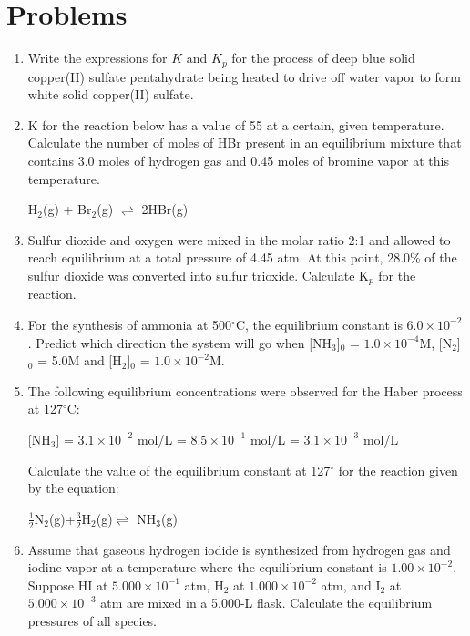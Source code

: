 \documentclass[../chem.tex]{subfiles}
\begin{document}
\section*{Problems}
\begin{enumerate}
    \item Write the expressions for $K$ and $K_p$ for the process of deep blue solid copper(II) sulfate pentahydrate being heated to drive off water vapor to form white solid copper(II) sulfate.
    \item K for the reaction below has a value of 55 at a certain, given temperature. Calculate the number of moles of HBr present in an equilibrium mixture that contains 3.0 moles of hydrogen gas and 0.45 moles of bromine vapor at this temperature.
    \begin{center}
        H$_2$(g) + Br$_2$(g) $\rightleftharpoons$ 2HBr(g)
    \end{center}
    \item Sulfur dioxide and oxygen were mixed in the molar ratio 2:1 and allowed to reach equilibrium at a total pressure of 4.45 atm. At this point, 28.0\% of the sulfur dioxide was converted into sulfur trioxide. Calculate K$_p$ for the reaction.
    \item For the synthesis of ammonia at 500$^{\circ}$C, the equilibrium constant is $6.0\times 10^{-2}$. Predict which direction the system will go when [NH$_3$]$_0$ = $1.0\times 10^{-4}$M, [N$_2$]$_0$ = 5.0M and [H$_2$]$_0$ = $1.0\times 10^{-2}$M.
    \item The following equilibrium concentrations were observed for the Haber process at 127$^{\circ}$C:
    \begin{center}
        [NH$_3$] = $3.1\times 10^{-2}$ mol/L \smallbreak  
        [N$_2$] = $8.5\times 10^{-1}$ mol/L \smallbreak 
        [H$_2$] = $3.1\times10^{-3}$ mol/L
    \end{center}
    Calculate the value of the equilibrium constant at 127$^{\circ}$ for the reaction given by the equation:
    \begin{center}
        $\frac{1}{2}$N$_2$(g)+$\frac{3}{2}$H$_2$(g)$\rightleftharpoons$ NH$_3$(g)
    \end{center}
    \item Assume that gaseous hydrogen iodide is synthesized from hydrogen gas and iodine vapor at a temperature where the equilibrium constant is $1.00\times 10^{-2}$. Suppose 
    HI at $5.000\times 10^{-1}$ atm, H$_2$ at $1.000\times 10^{-2}$ atm, and I$_2$ at $5.000\times 10^{-3}$ atm are mixed in a 5.000-L flask. Calculate the equilibrium pressures of all species.

\end{enumerate}
\end{document}
